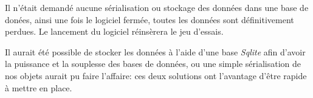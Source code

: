 \documentclass[12pt,a4paper,openany]{book}
\begin{document}
	\begin{remarque}
		Il n'était demandé aucune sérialisation ou stockage des données dans une base de donées, ainsi une fois le logiciel fermée, toutes les données
		sont définitivement perdues. Le lancement du logiciel réinsèrera le jeu d'essais.

		Il aurait été possible de stocker les données à l'aide d'une base \textit{Sqlite} afin d'avoir la puissance et la souplesse des bases de
		données, ou une simple sérialisation de nos objets aurait pu faire l'affaire: ces deux solutions ont l'avantage d'être rapide à mettre en place.
	\end{remarque}
\end{document}
